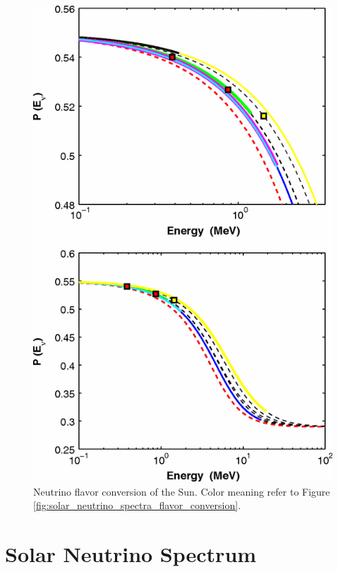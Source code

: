\begin{figure}
\centering
\includegraphics[width=\columnwidth]{chapters/assets/solar/solar_neutrino_flavor_conversion.png}
\caption{Neutrino flavor conversion of the Sun. Color meaning refer to Figure \ref{fig:solar_neutrino_spectra_flavor_conversion}.\cite{Lopes2013} }
\label{fig:solar_neutrino_flavor_conversion}
\end{figure}



\section{Solar Neutrino Spectrum}


